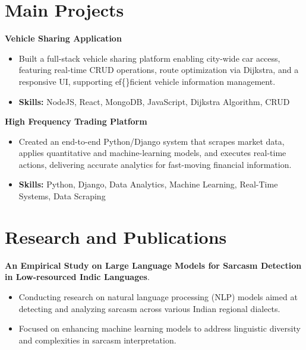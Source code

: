 \documentclass[a4paper,11pt]{article}
\begin{document}
\section{\textbf{Main Projects}}

\vspace{1mm}
  \textbf{Vehicle Sharing Application  }
\vspace{-1.5mm} %
\begin{itemize}
  \item Built a full-stack vehicle sharing platform enabling city-wide car access, featuring real-time CRUD operations, route optimization via Dijkstra, and a responsive UI, supporting ef\{\}ficient vehicle information management.
\vspace{-3mm}
  \item \textbf{Skills:} NodeJS, React, MongoDB, JavaScript, Dijkstra Algorithm, CRUD
\end{itemize}


\vspace{1mm}
   \textbf{High Frequency Trading Platform }
\vspace{-1.5mm} %
\begin{itemize}
  \item Created an end-to-end Python/Django system that scrapes market data, applies quantitative and machine-learning models, and executes real-time actions, delivering accurate analytics for fast-moving financial information.
\vspace{-3mm}
  \item \textbf{Skills:} Python, Django, Data Analytics, Machine Learning, Real-Time Systems, Data Scraping
\end{itemize}



\section{\textbf{Research and Publications} \hfill }
\vspace{1mm}
  \textbf{An Empirical Study on Large Language Models for Sarcasm Detection in Low-resourced Indic Languages}.
\vspace{-1mm} %
\begin{itemize}
  \item Conducting research on natural language processing (NLP) models aimed at detecting and analyzing sarcasm across various Indian regional dialects.
\vspace{-3mm}
  \item Focused on enhancing machine learning models to address linguistic diversity and complexities in sarcasm interpretation.
\end{itemize}
\end{document}
